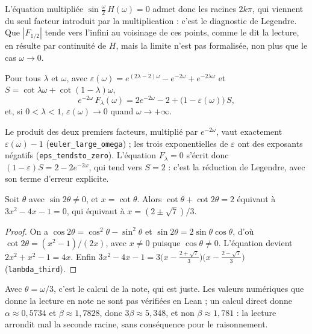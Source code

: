 \begin{remarque}
L'équation multipliée $\sin\frac{\omega}{2}\,H(\omega) = 0$ admet donc les racines $2k\pi$, qui viennent du seul facteur introduit par la multiplication : c'est le diagnostic de Legendre. Que $|F_{1/2}|$ tende vers l'infini au voisinage de ces points, comme le dit la lecture, en résulte par continuité de $H$, mais la limite n'est pas formalisée, non plus que le cas $\omega \to 0$.
\end{remarque}

\begin{enonce}
Pour tous $\lambda$ et $\omega$, avec $\varepsilon(\omega) = e^{(2\lambda - 2)\omega} - e^{-2\omega} + e^{-2\lambda\omega}$ et $S = \cot\lambda\omega + \cot(1-\lambda)\omega$,
\[ e^{-2\omega}\,F_\lambda(\omega) = 2e^{-2\omega} - 2 + \big(1 - \varepsilon(\omega)\big)\,S , \]
et, si $0 < \lambda < 1$, $\varepsilon(\omega) \to 0$ quand $\omega \to +\infty$.
\end{enonce}

Le produit des deux premiers facteurs, multiplié par $e^{-2\omega}$, vaut exactement $\varepsilon(\omega) - 1$ (\texttt{euler\_large\_omega}) ; les trois exponentielles de $\varepsilon$ ont des exposants négatifs (\texttt{eps\_tendsto\_zero}). L'équation $F_\lambda = 0$ s'écrit donc $(1 - \varepsilon)S = 2 - 2e^{-2\omega}$, qui tend vers $S = 2$ : c'est la réduction de Legendre, avec son terme d'erreur explicite.

\begin{enonce}[Legendre, vue 64, le cas $\lambda = 1/3$]
Soit $\theta$ avec $\sin 2\theta \neq 0$, et $x = \cot\theta$. Alors $\cot\theta + \cot 2\theta = 2$ équivaut à $3x^2 - 4x - 1 = 0$, qui équivaut à $x = (2 \pm \sqrt 7)/3$.
\end{enonce}

\begin{proof}
On a $\cos 2\theta = \cos^2\theta - \sin^2\theta$ et $\sin 2\theta = 2\sin\theta\cos\theta$, d'où $\cot 2\theta = (x^2 - 1)/(2x)$, avec $x \neq 0$ puisque $\cos\theta \neq 0$. L'équation devient $2x^2 + x^2 - 1 = 4x$. Enfin $3x^2 - 4x - 1 = 3\big(x - \tfrac{2+\sqrt7}{3}\big)\big(x - \tfrac{2-\sqrt7}{3}\big)$ (\texttt{lambda\_third}).
\end{proof}

\begin{remarque}
Avec $\theta = \omega/3$, c'est le calcul de la note, qui est juste. Les valeurs numériques que donne la lecture en note ne sont pas vérifiées en Lean ; un calcul direct donne $\alpha \approx 0{,}5734$ et $\beta \approx 1{,}7828$, donc $3\beta \approx 5{,}348$, et non $\beta \approx 1{,}781$ : la lecture arrondit mal la seconde racine, sans conséquence pour le raisonnement.
\end{remarque}

